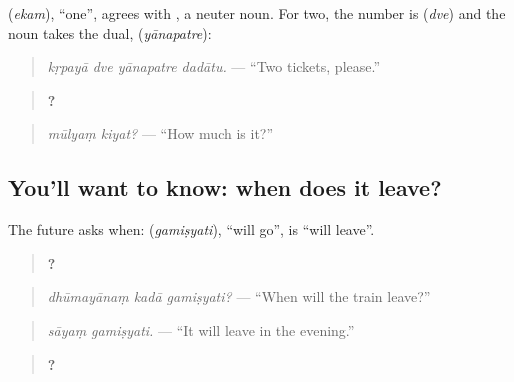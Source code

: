 \textbf{} (\emph{ekam}), \textquotedblleft{}one\textquotedblright{}, agrees with \textbf{}, a neuter noun. For two, the number is \textbf{} (\emph{dve}) and the noun takes the dual, \textbf{} (\emph{yānapatre}):

\begin{quote}
\textbf{   }
\end{quote}

\begin{quote}
\emph{kṛpayā dve yānapatre dadātu.} — \textquotedblleft{}Two tickets, please.\textquotedblright{}
\end{quote}

\begin{quote}
\textbf{ ?}
\end{quote}

\begin{quote}
\emph{mūlyaṃ kiyat?} — \textquotedblleft{}How much is it?\textquotedblright{}
\end{quote}

\subsection*{You'll want to know: when does it leave?}
The future asks when: \textbf{} (\emph{gamiṣyati}), \textquotedblleft{}will go\textquotedblright{}, is \textquotedblleft{}will leave\textquotedblright{}.

\begin{quote}
\textbf{  ?}
\end{quote}

\begin{quote}
\emph{dhūmayānaṃ kadā gamiṣyati?} — \textquotedblleft{}When will the train leave?\textquotedblright{}
\end{quote}

\begin{quote}
\textbf{ }
\end{quote}

\begin{quote}
\emph{sāyaṃ gamiṣyati.} — \textquotedblleft{}It will leave in the evening.\textquotedblright{}
\end{quote}

\begin{quote}
\textbf{  ?}
\end{quote}

